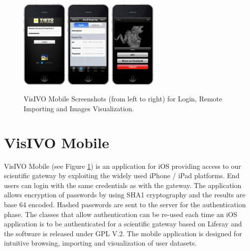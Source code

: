 \begin{figure}
    \centering
    \includegraphics[width=0.2\textwidth]{part5/Costa_O08/O08_f3.eps}
    \includegraphics[width=0.2\textwidth]{part5/Costa_O08/O08_f4.eps}
    \includegraphics[width=0.2\textwidth]{part5/Costa_O08/O08_f5.eps}
    \caption{VisIVO Mobile Screenshots (from left to right) for Login, Remote Importing and Images Visualization.}
\label{fig:visivomobile}
\end{figure}

\section{VisIVO Mobile}
VisIVO Mobile  (see Figure \ref{fig:visivomobile}) is an application for iOS providing access to our scientific gateway by exploiting the widely used iPhone / iPad platforms. End users can login with the same credentials as with the gateway. The application allows encryption of passwords by using SHA1 cryptography and the results are base 64 encoded. Hashed passwords are sent to the server for the authentication phase. The classes that allow authentication can be re-used each time an iOS application is to be authenticated for a scientific gateway based on Liferay  and the software is released under GPL V.2. The mobile application is designed for intuitive browsing, importing and visualization of user datasets.

